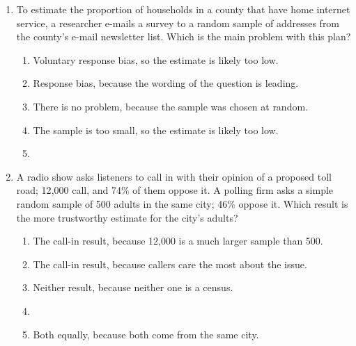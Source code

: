 \documentclass[12pt]{article}
\begin{document}
\begin{enumerate}[leftmargin=1.9em, itemsep=0.13in]
  \boxguard[13]
  \item To estimate the proportion of households in a county that have home internet service,
        a researcher e-mails a survey to a random sample of addresses from the county's
        e-mail newsletter list. Which is the main problem with this plan?
        \begin{enumerate}[label=\textbf{(\Alph*)}, leftmargin=2.2em, itemsep=2pt]
          \item Voluntary response bias, so the estimate is likely too low.
          \item Response bias, because the wording of the question is leading.
          \item There is no problem, because the sample was chosen at random.
          \item The sample is too small, so the estimate is likely too low.
          \item {}\\
                \hfill{}\rule[-0.2in]{0pt}{0.48in}
        \end{enumerate}

  \boxguard[14]
  \item A radio show asks listeners to call in with their opinion of a proposed toll road;
        12{,}000 call, and 74\% of them oppose it. A polling firm asks a simple random sample
        of 500 adults in the same city; 46\% oppose it. Which result is the more trustworthy
        estimate for the city's adults?
        \begin{enumerate}[label=\textbf{(\Alph*)}, leftmargin=2.2em, itemsep=2pt]
          \item The call-in result, because 12{,}000 is a much larger sample than 500.
          \item The call-in result, because callers care the most about the issue.
          \item Neither result, because neither one is a census.
          \item {}\\
          \item Both equally, because both come from the same city.\hfill{}\rule[-0.2in]{0pt}{0.48in}
        \end{enumerate}


\end{enumerate}
\end{document}
